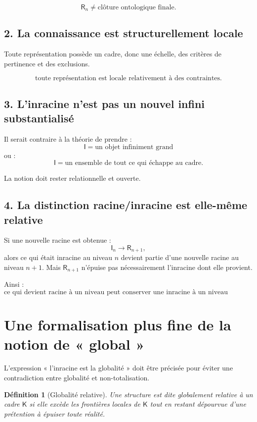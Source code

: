 \documentclass[11pt,a4paper]{article}
\newtheorem{definition}{Définition}[section]
\newcommand{\Rac}{\mathsf{R}}
\newcommand{\Inrac}{\mathsf{I}}
\newcommand{\Cadre}{\mathsf{K}}
\begin{document}
\[
\boxed{
\Rac_n\neq\text{clôture ontologique finale}.
}
\]

\subsection{2. La connaissance est structurellement locale}

Toute représentation possède un cadre, donc une échelle, des critères de
pertinence et des exclusions.

\[
\boxed{
\text{toute représentation est locale relativement à des contraintes.}
}
\]

\subsection{3. L'inracine n'est pas un nouvel infini substantialisé}

Il serait contraire à la théorie de prendre :
\[
\Inrac=\text{un objet infiniment grand}
\]
ou :
\[
\Inrac=\text{un ensemble de tout ce qui échappe au cadre}.
\]

La notion doit rester relationnelle et ouverte.

\subsection{4. La distinction racine/inracine est elle-même relative}

Si une nouvelle racine est obtenue :
\[
\Inrac_n\to\Rac_{n+1},
\]
alors ce qui était inracine au niveau \(n\) devient partie d'une nouvelle
racine au niveau \(n+1\). Mais \(\Rac_{n+1}\) n'épuise pas nécessairement
l'inracine dont elle provient.

Ainsi :
\[
\boxed{
\text{ce qui devient racine à un niveau peut conserver une inracine à un niveau supérieur.}
}
\]

\section{Une formalisation plus fine de la notion de « global »}

L'expression « l'inracine est la globalité » doit être précisée pour éviter une
contradiction entre globalité et non-totalisation.

\begin{definition}[Globalité relative]
Une structure est dite \emph{globalement relative} à un cadre \(\Cadre\) si
elle excède les frontières locales de \(\Cadre\) tout en restant dépourvue
d'une prétention à épuiser toute réalité.
\end{definition}
\end{document}
